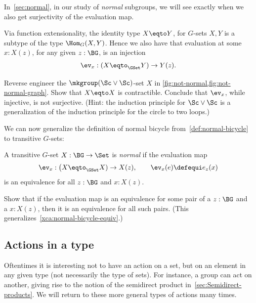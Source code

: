 In~\cref{sec:normal}, in our study of {\em normal} subgroups, we will see exactly when
we also get surjectivity of the evaluation map.


Via function extensionality,
the identity type $X \eqto Y$, for $G$-sets $X,Y$
is a subtype of the type $\Hom_G(X,Y)$.
Hence we also have that evaluation at some $x:X(z)$,
for any given $z:\BG$, is an injection
\[
  \ev_x:(X \eqto_{\GSet} Y)\to Y(z).
\]
\begin{xca}\label{xca:not-normal}
Reverse engineer the $\mkgroup(\Sc\vee\Sc)$-set $X$ in 
\cref{fig:not-normal,fig:not-normal-graph}.
Show that $X\eqto X$ is contractible.
Conclude that $\ev_x$, while injective, is not surjective.
(Hint: the induction principle for $\Sc\vee\Sc$ is a generalization
of the induction principle for the circle to two loops.)
\end{xca}
We can now generalize the definition of normal bicycle
from~\cref{def:normal-bicycle} to
transitive $G$-sets:
\begin{definition}\label{def:normal-action}
  A transitive $G$-set $X : \BG \to \Set$
  is \emph{normal} if the evaluation map
  \[
    \ev_x: \bigl(X \eqto_{\GSet} X) \to X(z),
    \qquad \ev_{x}(e)\defequi e_z(x)
  \]
  is an equivalence for all $z:\BG$ and $x:X(z)$.
\end{definition}
\begin{xca}\label{xca:normal-action-equiv}
  Show that if the evaluation map is an equivalence for some pair of a $z:\BG$ and a $x:X(z)$,
  then it is an equivalence for all such pairs.
  (This generalizes~\cref{xca:normal-bicycle-equiv}.)
\end{xca}

\subsection{Actions in a type}
\label{sec:actions}
Oftentimes it is interesting not to have an action on a set, 
but on an element in any given type (not necessarily the type of sets).  
For instance, a group can act on another, giving rise to the notion of 
the semidirect product in~\cref{sec:Semidirect-products}.  
We will return to these more general types of actions many times.

